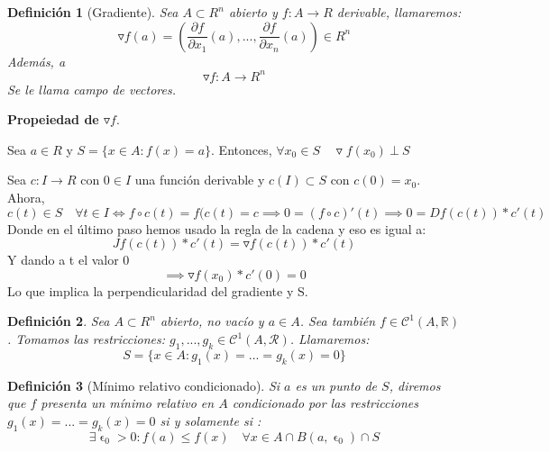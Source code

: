 \documentclass[11pt, a4paper, titlepage]{article}
\makeatletter
\renewenvironment{proof}[1][\proofname] {\vspace{-15pt}\par\pushQED{\qed}\normalfont\topsep6\p@\@plus6\p@\relax\trivlist\item[\hskip\labelsep\it#1\@addpunct{.}]\ignorespaces}{\popQED\endtrivlist\@endpefalse}
\theoremstyle{theorem-style}
\theoremstyle{definition-style}
\newtheorem*{ndef}{Definición}
\theoremstyle{remark-style}
\theoremstyle{example-style}
\makeatother
\begin{document}
\begin{ndef}[Gradiente]
	Sea $A\subset R^n$ abierto y $f:A\to R$ derivable, llamaremos:
	\[
	\triangledown f(a) = (\frac{\partial f}{\partial x_1}(a),...,\frac{\partial f}{\partial x_n}(a))\in R^n
	\]
	Además, a 
	\[
	\triangledown f: A \to R^n
	\]
	Se le llama campo de vectores.
	\end{ndef}

\textbf{Propeiedad de $\triangledown f$}.

Sea $a \in R$ y $S =\{x \in A :f(x) = a\}$. Entonces, $\forall x_0 \in S \quad \triangledown f(x_0) \  \bot \ S$
\begin{proof}
	Sea $c : I \to R$ con $0 \in I$ una función derivable y $c(I)\subset S$ con $c(0)=x_0$. Ahora,
	\[
	c(t) \in S \quad \forall t \in I \iff f\circ c(t) = f(c(t) = c \implies 0 = (f\circ c)'(t) \implies 0 = Df(c(t))*c'(t)
	\]
	Donde en el último paso hemos usado la regla de la cadena y eso es igual a:
	\[
	Jf(c(t))*c'(t)= \triangledown f(c(t))*c'(t)
	\]
	Y dando a t el valor 0
	\[
	\implies \triangledown f(x_0)*c'(0) = 0
	\]
	Lo que implica la perpendicularidad del gradiente y S.
\end{proof}


\begin{ndef}
	Sea $A\subset R^n$ abierto, no vacío y $a\in A$. Sea también $f\in \mathcal{C}^1(A,\mathbb{R})$. Tomamos las restricciones: $g_1,...,g_k \in \mathcal{C}^1(A,\mathcal{R})$.
	Llamaremos:
	\[
	S=\{ x\in A:g_1(x)=...=g_k(x) = 0\}
	\]
	
\end{ndef}

	

\begin{ndef}[Mínimo relativo condicionado]
	Si $a$ es un punto de $S$, diremos que $f$ presenta un mínimo relativo en $A$ condicionado por las restricciones $g_1(x)=...=g_k(x) = 0$ si y solamente si :
	\[
	\exists \upvarepsilon_0 > 0 : f(a) \leq f(x) \quad \forall x \in A\cap B(a,\upvarepsilon_0) \cap S 
	\]
\end{ndef}
\end{document}
